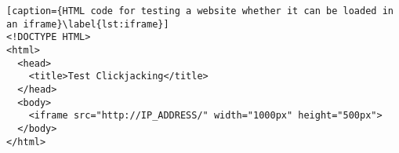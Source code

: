 \lstset{language=HTML, basicstyle=\footnotesize, frame=single, captionpos=t,  linewidth=.9\textwidth, xleftmargin=.12\textwidth}
\begin{lstlisting}[caption={HTML code for testing a website whether it can be loaded in an iframe}\label{lst:iframe}]
<!DOCTYPE HTML>
<html>
  <head>
    <title>Test Clickjacking</title>
  </head>
  <body>
    <iframe src="http://IP_ADDRESS/" width="1000px" height="500px">
  </body>
</html>
\end{lstlisting}
\clearpage